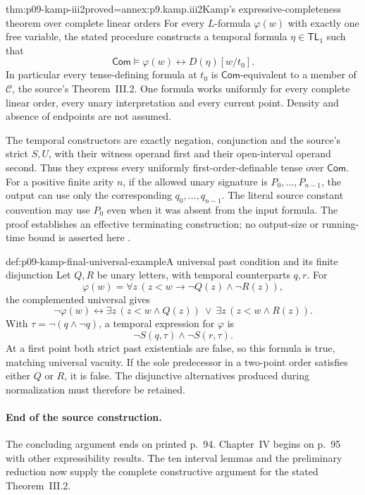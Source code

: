 \begin{hbtheorem}{thm:p09-kamp-iii2}{proved=annex:p9.kamp.iii2}{Kamp's expressive-completeness theorem over complete linear orders}
For every \(L\)-formula \(\varphi(w)\) with exactly one free
variable, the stated procedure constructs a temporal formula
\(\eta\in\mathsf{TL}_1\) such that
\[
          \mathsf{Com}\models
                \varphi(w)\longleftrightarrow D(\eta)[w/t_0].
\]
In particular every tense-defining formula at \(t_0\) is
\(\mathsf{Com}\)-equivalent to a member of \(\mathcal C\),
the source's Theorem~III.2. One formula works uniformly for every
complete linear order, every unary interpretation and every current
point. Density and absence of endpoints are not assumed.

The temporal constructors are exactly negation, conjunction and the
source's strict \(S,U\), with their witness operand first and
their open-interval operand second. Thus they express every uniformly
first-order-definable tense over \(\mathsf{Com}\).
For a positive finite arity \(n\), if the allowed unary signature
is \(P_0,\ldots,P_{n-1}\), the output can use only the corresponding
\(q_0,\ldots,q_{n-1}\). The literal source constant convention
may use \(P_0\) even when it was absent from the input formula.
The proof establishes an effective terminating construction; no
output-size or running-time bound is asserted here
\cite[ch.~III, thm.~2, p.~60 and pp.~93--94]{Kamp1968}.
\end{hbtheorem}

\begin{hbexample}{def:p09-kamp-final-universal-example}{A universal past condition and its finite disjunction}
Let \(Q,R\) be unary letters, with temporal counterparts \(q,r\).
For
\[
 \varphi(w)=\forall z\,(z<w\to\neg Q(z)\land\neg R(z)),
\]
the complemented universal gives
\[
 \neg\varphi(w)\longleftrightarrow
       \exists z\,(z<w\land Q(z))\ \lor\
       \exists z\,(z<w\land R(z)).
\]
With \(\tau=\neg(q\land\neg q)\), a temporal expression
for \(\varphi\) is
\[
                        \neg S(q,\tau)\land\neg S(r,\tau).
\]
At a first point both strict past existentials are false, so this
formula is true, matching universal vacuity. If the sole predecessor
in a two-point order satisfies either \(Q\) or \(R\), it is
false. The disjunctive alternatives produced during normalization
must therefore be retained.
\end{hbexample}

\paragraph{End of the source construction.}
The concluding argument ends on printed p.~94. Chapter~IV begins on
p.~95 with other expressibility results. The ten interval lemmas and
the preliminary reduction now supply the complete constructive argument
for the stated Theorem~III.2.
